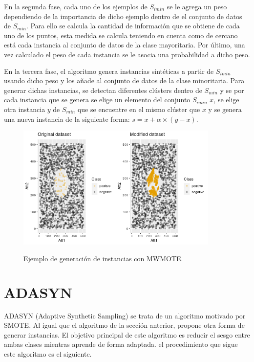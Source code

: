 En la segunda fase, cada uno de los ejemplos de $S_{imin}$ se le agrega un peso dependiendo de la importancia de dicho ejemplo dentro de el conjunto de datos de $S_{min}$. Para ello se calcula la cantidad de información que se obtiene de cada uno de los puntos, esta medida se calcula teniendo en cuenta como de cercano está cada instancia al conjunto de datos de la clase mayoritaria. Por último, una vez calculado el peso de cada instancia se le asocia una probabilidad a dicho peso.\newline

En la tercera fase, el algoritmo genera instancias sintéticas a partir de $S_{imin}$ usando dicho peso y los añade al conjunto de datos de la clase minoritaria. Para generar dichas instancias, se detectan diferentes clústers dentro de $S_{min}$ y se por cada instancia que se genera se elige un elemento del conjunto $S_{imin}$ $x$, se elige otra instancia $y$ de $S_{min}$ que se encuentre en el mismo clúster que $x$ y se genera una nueva instancia de la siguiente forma: $ s = x + \alpha \times (y-x)$. \newline

\begin{figure}[h]
	\centering
	\includegraphics[width=100mm]{imagenes/MWMOTE_comparison.png}
	\label{fig:42}
	\caption{Ejemplo de generación de instancias con MWMOTE.}
\end{figure}
\verticalspace
\newpage
\section{ADASYN}
ADASYN (Adaptive Synthetic Sampling) se trata de un algoritmo motivado por SMOTE. Al igual que el algoritmo de la sección anterior, propone otra forma de generar instancias. El objetivo principal de este algoritmo es reducir el sesgo entre ambas clases mientras aprende de forma adaptada. el procedimiento que sigue este algoritmo es el siguiente.\newline

